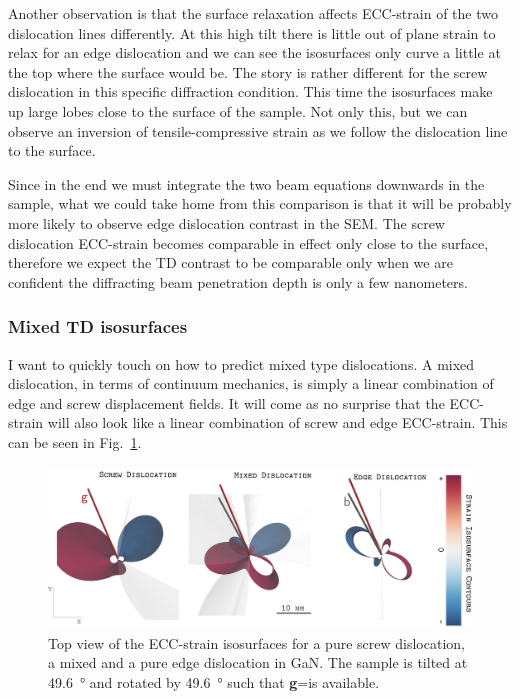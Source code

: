 Another observation is that the surface relaxation affects ECC-strain of the two dislocation lines differently. At this high tilt there is little out of plane strain to relax for an edge dislocation and we can see the isosurfaces only curve a little at the top where the surface would be. The story is rather different for the screw dislocation in this specific diffraction condition. This time the isosurfaces make up large lobes close to the surface of the sample. Not only this, but we can observe an inversion of tensile-compressive strain as we follow the dislocation line to the surface. 

Since in the end we must integrate the two beam equations downwards in the sample, what we could take home from this comparison is that it will be probably more likely to observe edge dislocation contrast in the SEM. The screw dislocation ECC-strain becomes comparable in effect only close to the surface, therefore we expect the TD contrast to be comparable only when we are confident the diffracting beam penetration depth is only a few nanometers. 

\subsubsection{Mixed TD isosurfaces}

I want to quickly touch on how to predict mixed type dislocations. A mixed dislocation, in terms of continuum mechanics, is simply a linear combination of edge and screw displacement fields. It will come as no surprise that the ECC-strain will also look like a linear combination  of screw  and edge ECC-strain. This can be seen in Fig.~\ref{fig:mixed}.



\begin{figure}[ht]
    \centering
    \includegraphics[width=1\linewidth]{Figures/GaNTDtop.png}
    \caption[Mixed TD ECC-strain.]{Top view of the ECC-strain isosurfaces for a pure screw dislocation, a mixed and a pure edge dislocation in GaN. The sample is tilted at \SI{49.6}{\degree} and rotated by \SI{49.6}{\degree} such that \textbf{g}=\hkl[75-3] is available.}
    \label{fig:mixed}
\end{figure}


